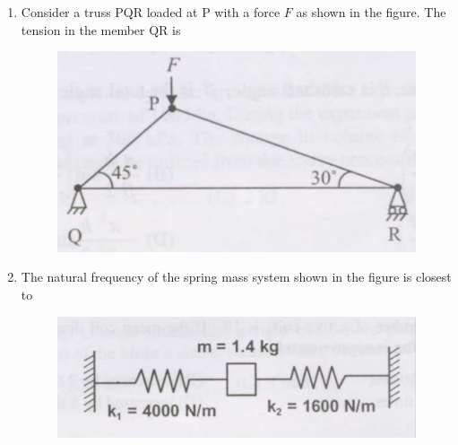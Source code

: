 \documentclass[journal,12pt,onecolumn]{IEEEtran}
\begin{document}
\begin{enumerate}[resume]
    \item Consider a truss PQR loaded at P with a force $F$ as shown in the figure.
          The tension in the member QR is
          \begin{figure}[H]
              \centering
              \includegraphics[scale=0.3]{q34}
              \caption{}
              \label{q34}
          \end{figure}

          \begin{enumerate}
          \end{enumerate}

    \item The natural frequency of the spring mass system shown in the figure is closest to
          \begin{figure}[H]
              \centering
              \includegraphics[scale=0.3]{q35}
              \caption{}
              \label{q35}
          \end{figure}


\end{enumerate}
\end{document}
